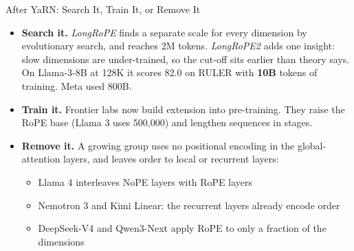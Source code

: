 \begin{frame}{After YaRN: Search It, Train It, or Remove It}
    \begin{itemize}\itemsep0.6em
        \item \textbf{Search it.} \emph{LongRoPE} finds a separate scale for every dimension by evolutionary search, and reaches 2M tokens. \emph{LongRoPE2} adds one insight: slow dimensions are under-trained, so the cut-off sits earlier than theory says. On Llama-3-8B at 128K it scores 82.0 on RULER with \textbf{10B} tokens of training. Meta used 800B.
        \item \textbf{Train it.} Frontier labs now build extension into pre-training. They raise the RoPE base (Llama 3 uses 500,000) and lengthen sequences in stages.
        \item \textbf{Remove it.} A growing group uses \alert{no positional encoding} in the global-attention layers, and leaves order to local or recurrent layers:
        \begin{itemize}\itemsep0.2em
            \item Llama 4 interleaves NoPE layers with RoPE layers
            \item Nemotron 3 and Kimi Linear: the recurrent layers already encode order
            \item DeepSeek-V4 and Qwen3-Next apply RoPE to only a fraction of the dimensions
        \end{itemize}
    \end{itemize}
\end{frame}

